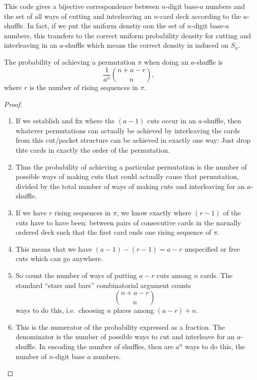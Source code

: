 \documentclass[12pt]{article}
\begin{document}
This code gives a bijective correspondence between \( n \)-digit base-\(
a \) numbers and the set of all ways of cutting and interleaving an \( n
\)-card deck according to the \( a \)-shuffle.  In fact, if we put the
uniform denstiy oon the set of \( n \)-digit base-\( a \) numbers, this
transfers to the correct uniform probability density for cutting and
interleaving in an \( a \)-shuffle which means the correct density in
induced on \( S_n \).

\begin{theorem}
    The probability of achieving a permutation \( \pi \) when doing an \(
    a \)-shuffle is
    \[
        \frac{1}{a^n} \binom{n + a - r}{n},
    \] where \( r \) is the number of rising sequences in \( \pi \).
\end{theorem}

\begin{proof}
    \begin{enumerate}
        \item
            If we establish and fix where the \( (a-1) \) cuts occur in
            an \( a \)-shuffle, then whatever permutations can actually
            be achieved by interleaving the cards from this cut/packet
            structure can be achieved in exactly one way:  Just drop
            thte cards in exactly the order of the permutation.
        \item
            Thus the probability of achieving a particular permutation
            is the number of possible ways of making cuts that could
            actually cause that permutation, divided by the total number
            of ways of making cuts and interleaving for an \( a \)-shuffle.
        \item
            If we have \( r \) rising sequences in \( \pi \), we know
            exactly where \( (r-1) \) of the cuts have to have been:
            between pairs of consecutive cards in the narually ordered
            deck such that the first card ends one rising sequence of \(
            \pi \).
        \item
            This means that we have \( (a-1) - (r-1) = a-r \)
            unspecified or free cuts which can go anywhere.
        \item
            So count the number of ways of putting \( a-r \) cuts among \(
            n \) cards.  The standard ``stars and bars'' combinatorial
            argument counts
            \[
                \binom{n + a-r}{n}
            \] ways to do this, i.e.\ choosing \( n \) places among \( (a-r)
            + n \).
        \item
            This is the numerator of the probability expressed as a
            fraction.  The denominator is the number of possible ways to
            cut and interleave for an \( a \)-shuffle.  In encoding the
            number of shuffles, then are \( a^n \) ways to do this, the
            number of \( n \)-digit base \( a \) numbers.
    \end{enumerate}
\end{proof}
\end{document}
